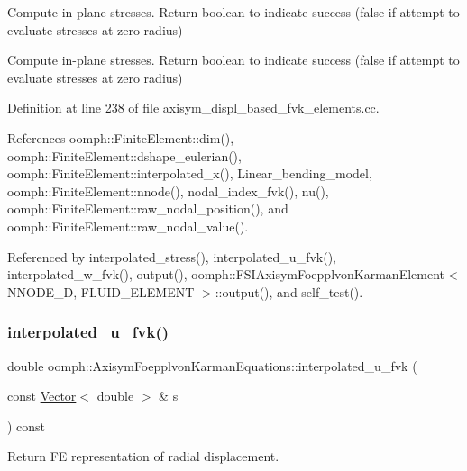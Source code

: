 Compute in-\/plane stresses. Return boolean to indicate success (false if attempt to evaluate stresses at zero radius) 

Compute in-\/plane stresses. Return boolean to indicate success (false if attempt to evaluate stresses at zero radius) 

Definition at line 238 of file axisym\+\_\+displ\+\_\+based\+\_\+fvk\+\_\+elements.\+cc.



References oomph\+::\+Finite\+Element\+::dim(), oomph\+::\+Finite\+Element\+::dshape\+\_\+eulerian(), oomph\+::\+Finite\+Element\+::interpolated\+\_\+x(), Linear\+\_\+bending\+\_\+model, oomph\+::\+Finite\+Element\+::nnode(), nodal\+\_\+index\+\_\+fvk(), nu(), oomph\+::\+Finite\+Element\+::raw\+\_\+nodal\+\_\+position(), and oomph\+::\+Finite\+Element\+::raw\+\_\+nodal\+\_\+value().



Referenced by interpolated\+\_\+stress(), interpolated\+\_\+u\+\_\+fvk(), interpolated\+\_\+w\+\_\+fvk(), output(), oomph\+::\+F\+S\+I\+Axisym\+Foepplvon\+Karman\+Element$<$ N\+N\+O\+D\+E\+\_\+D, F\+L\+U\+I\+D\+\_\+\+E\+L\+E\+M\+E\+N\+T $>$\+::output(), and self\+\_\+test().

\mbox{\label{classoomph_1_1AxisymFoepplvonKarmanEquations_ac24fc0416243162170ad09c7f3261ebd}} 
\subsubsection{\texorpdfstring{interpolated\+\_\+u\+\_\+fvk()}{interpolated\_u\_fvk()}}
{\footnotesize\ttfamily double oomph\+::\+Axisym\+Foepplvon\+Karman\+Equations\+::interpolated\+\_\+u\+\_\+fvk (\begin{DoxyParamCaption}\item[{const \hyperlink{classoomph_1_1Vector}{Vector}$<$ double $>$ \&}]{s }\end{DoxyParamCaption}) const\hspace{0.3cm}{\ttfamily [inline]}}



Return FE representation of radial displacement. 



